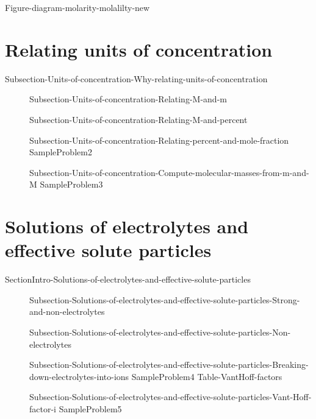 \documentclass[main.tex]{subfiles}
\begin{document}
{Figure-diagram-molarity-molalilty-new}
\section{Relating units of concentration}{Subsection-Units-of-concentration-Why-relating-units-of-concentration}
\sloppy \begin{description}
 \item[] {Subsection-Units-of-concentration-Relating-M-and-m}
\item[] {Subsection-Units-of-concentration-Relating-M-and-percent}
\item[] {Subsection-Units-of-concentration-Relating-percent-and-mole-fraction}
{SampleProblem2}
\item[] {Subsection-Units-of-concentration-Compute-molecular-masses-from-m-and-M}
{SampleProblem3}
\end{description}



\section{Solutions of electrolytes and effective solute particles}{SectionIntro-Solutions-of-electrolytes-and-effective-solute-particles}
\sloppy \begin{description}
\item[] {Subsection-Solutions-of-electrolytes-and-effective-solute-particles-Strong-and-non-electrolytes}
\item[] {Subsection-Solutions-of-electrolytes-and-effective-solute-particles-Non-electrolytes}
\item[] {Subsection-Solutions-of-electrolytes-and-effective-solute-particles-Breaking-down-electrolytes-into-ions}
{SampleProblem4}
{Table-VantHoff-factors}
\item[] {Subsection-Solutions-of-electrolytes-and-effective-solute-particles-Vant-Hoff-factor-i}
{SampleProblem5}
\end{description}
\end{document}
